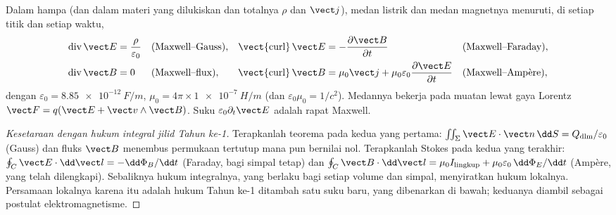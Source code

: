 \begin{theorem}\label{thm:b2:maxwell-equations:maxwell}
Dalam hampa (dan dalam materi yang dilukiskan  dan  totalnya $\rho$ dan $\vect j$), medan listrik dan medan magnetnya menuruti, di
setiap titik dan setiap waktu,
\begin{align*}
\operatorname{div}\vect E &= \frac\rho{\varepsilon_0} &&\text{(Maxwell--Gauss)} , &
\operatorname{\vect{curl}}\vect E &= -\frac{\partial\vect B}{\partial t} &&\text{(Maxwell--Faraday)} ,\\
\operatorname{div}\vect B &= 0 &&\text{(Maxwell--flux)} , &
\operatorname{\vect{curl}}\vect B &= \mu_0\vect j + \mu_0\varepsilon_0\frac{\partial\vect E}{\partial t} &&\text{(Maxwell--Ampère)} ,
\end{align*}
dengan $\varepsilon_0 = \qty{8.85e-12}{F/m}$, $\mu_0 = 4\pi \times \qty{1e-7}{H/m}$ (dan
$\varepsilon_0\mu_0 = 1/c^2$). Medannya bekerja pada muatan lewat gaya
Lorentz $\vect F = q(\vect E + \vect v\wedge\vect B)$. Suku $\varepsilon_0\partial_t\vect E$
adalah rapat \emph{} Maxwell.
\end{theorem}

\begin{proof}[Kesetaraan dengan hukum integral jilid Tahun ke-1]
Terapkanlah teorema  pada kedua yang pertama: $\iint_\Sigma\vect E\cdot
\vect n\,\dd S = Q_{\text{dlm}}/\varepsilon_0$ (Gauss) dan fluks $\vect B$
menembus permukaan tertutup mana pun bernilai nol. Terapkanlah Stokes pada kedua yang terakhir:
$\oint_C\vect E\cdot\dd\vect l = -\dd\Phi_B/\dd t$ (Faraday, bagi simpal tetap)
dan $\oint_C\vect B\cdot\dd\vect l = \mu_0I_{\text{lingkup}} + \mu_0\varepsilon_0\,\dd\Phi_E/\dd t$
(Ampère, yang telah dilengkapi). Sebaliknya hukum integralnya, yang berlaku bagi setiap
volume dan simpal, menyiratkan hukum lokalnya. Persamaan lokalnya karena itu
adalah hukum Tahun ke-1 ditambah satu suku baru, yang dibenarkan di bawah; keduanya diambil sebagai
postulat elektromagnetisme.
\end{proof}

